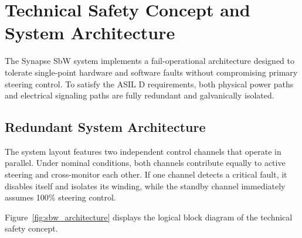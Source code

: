 \section{Technical Safety Concept and System Architecture}
\label{sec:architecture}

The Synapse SbW system implements a fail-operational architecture designed to tolerate single-point hardware and software faults without compromising primary steering control. To satisfy the ASIL D requirements, both physical power paths and electrical signaling paths are fully redundant and galvanically isolated.

\subsection{Redundant System Architecture}
The system layout features two independent control channels that operate in parallel. Under nominal conditions, both channels contribute equally to active steering and cross-monitor each other. If one channel detects a critical fault, it disables itself and isolates its winding, while the standby channel immediately assumes 100\% steering control.

Figure~\ref{fig:sbw_architecture} displays the logical block diagram of the technical safety concept.

